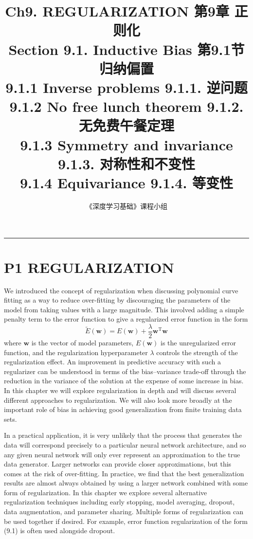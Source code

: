\documentclass{article}
\title{Ch9. REGULARIZATION \hfill 第9章 正则化 \\ 
Section 9.1. Inductive Bias \hfill 第9.1节 归纳偏置 \\ 
9.1.1 Inverse problems \hfill 9.1.1. 逆问题\\
9.1.2 No free lunch theorem \hfill 9.1.2. 无免费午餐定理\\
9.1.3 Symmetry and invariance \hfill 9.1.3. 对称性和不变性\\
9.1.4 Equivariance \hfill 9.1.4. 等变性}
\author{《深度学习基础》课程小组}
\begin{document}
\maketitle

\setlength{\parindent}{0pt} %
\setlength{\parskip}{1.5em} %

\noindent\rule{\linewidth}{0.4pt}

\section{P1 REGULARIZATION}

We introduced the concept of regularization when discussing polynomial curve fitting as a way to reduce over-fitting by discouraging the parameters of the model from taking values with a large magnitude. This involved adding a simple penalty term to the error function to give a regularized error function in the form
\begin{equation}
\widetilde{E}(\mathbf{w}) = E(\mathbf{w}) + \frac{\lambda}{2} \mathbf{w}^\mathrm{T} \mathbf{w}
\tag{9.1}
\end{equation}
where $\mathbf{w}$ is the vector of model parameters, $E(\mathbf{w})$ is the unregularized error function, and the regularization hyperparameter $\lambda$ controls the strength of the regularization effect. An improvement in predictive accuracy with such a regularizer can be understood in terms of the bias--variance trade-off through the reduction in the variance of the solution at the expense of some increase in bias. In this chapter we will explore regularization in depth and will discuss several different approaches to regularization. We will also look more broadly at the important role of bias in achieving good generalization from finite training data sets.

In a practical application, it is very unlikely that the process that generates the data will correspond precisely to a particular neural network architecture, and so any given neural network will only ever represent an approximation to the true data generator. Larger networks can provide closer approximations, but this comes at the risk of over-fitting. In practice, we find that the best generalization results are almost always obtained by using a larger network combined with some form of regularization. In this chapter we explore several alternative regularization techniques including early stopping, model averaging, dropout, data augmentation, and parameter sharing. Multiple forms of regularization can be used together if desired. For example, error function regularization of the form (9.1) is often used alongside dropout.
\end{document}
